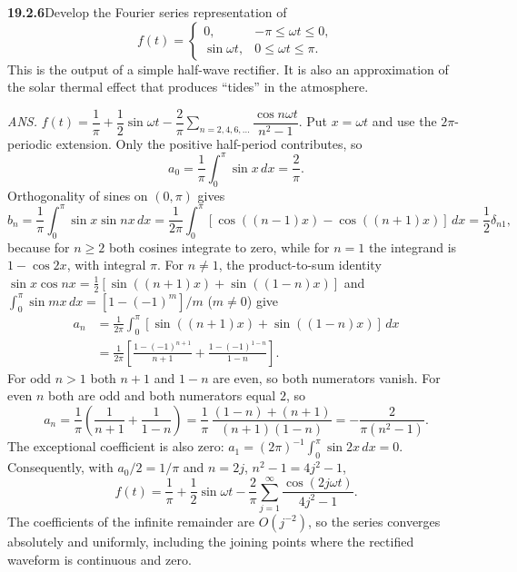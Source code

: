 \par\bigskip
\noindent\textbf{19.2.6}\quad Develop the Fourier series
representation of
\[
f(t)=\begin{cases}
0, & -\pi\le\omega t\le0,\\
\sin\omega t, & 0\le\omega t\le\pi.
\end{cases}
\]
This is the output of a simple half-wave rectifier. It is also an
approximation of the solar thermal effect that produces ``tides''
in the atmosphere.
\par\nobreak\hfill\emph{ANS.}\enspace
$f(t)=\dfrac{1}{\pi}+\dfrac{1}{2}\sin\omega t
-\dfrac{2}{\pi}\displaystyle\sum_{n=2,4,6,\ldots}
\dfrac{\cos n\omega t}{n^{2}-1}$.
\solution
Put $x=\omega t$ and use the $2\pi$-periodic extension. Only the
positive half-period contributes, so
\[
a_0=\frac1\pi\int_0^\pi\sin x\,dx=\frac2\pi.
\]
Orthogonality of sines on $(0,\pi)$ gives
\[
b_n=\frac1\pi\int_0^\pi\sin x\sin nx\,dx
=\frac1{2\pi}\int_0^\pi[\cos((n-1)x)-\cos((n+1)x)]\,dx
=\frac12\delta_{n1},
\]
because for $n\ge2$ both cosines integrate to zero, while for $n=1$ the
integrand is $1-\cos2x$, with integral $\pi$.
For $n\ne1$, the product-to-sum identity
$\sin x\cos nx=\frac12[\sin((n+1)x)+\sin((1-n)x)]$ and
$\int_0^\pi\sin mx\,dx=[1-(-1)^m]/m$ ($m\ne0$) give
\begin{align*}
a_n&=\frac1{2\pi}\int_0^\pi
 [\sin((n+1)x)+\sin((1-n)x)]\,dx\\
&=\frac1{2\pi}\left[
\frac{1-(-1)^{n+1}}{n+1}
+\frac{1-(-1)^{1-n}}{1-n}\right].
\end{align*}
For odd $n>1$ both $n+1$ and $1-n$ are even, so both numerators vanish.
For even $n$ both are odd and both numerators equal $2$, so
\[
a_n=\frac1\pi\left(\frac1{n+1}+\frac1{1-n}\right)
=\frac1\pi\,\frac{(1-n)+(n+1)}{(n+1)(1-n)}
=-\frac{2}{\pi(n^2-1)}.
\]
The exceptional coefficient is also zero:
$a_1=(2\pi)^{-1}\int_0^\pi\sin2x\,dx=0$.
Consequently, with $a_0/2=1/\pi$ and $n=2j$, $n^2-1=4j^2-1$,
\[
\boxed{f(t)=\frac1\pi+\frac12\sin\omega t
-\frac2\pi\sum_{j=1}^{\infty}
\frac{\cos(2j\omega t)}{4j^2-1}.}
\]
The coefficients of the infinite remainder are $O(j^{-2})$, so the
series converges absolutely and uniformly, including the joining points
where the rectified waveform is continuous and zero.

